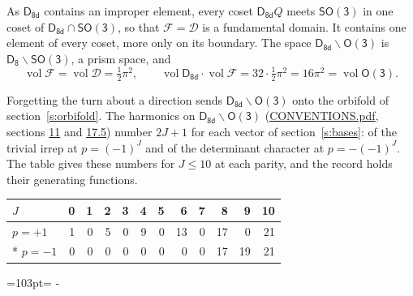\documentclass[10pt,a4paper]{article}
\newcommand{\needspace}[1]{\par\penalty-100\begingroup\dimen0=#1\relax\dimen2=\pagegoal
  \advance\dimen2-\pagetotal\ifdim\dimen0>\dimen2\relax\ifdim\dimen2>0pt\vfil\break\fi\fi
  \endgroup}
\numberwithin{equation}{section}
\newcommand{\grp}[1]{\mathsf{#1}}
\newcommand{\vol}{\operatorname{vol}}
\newcommand{\fcell}{\mathcal{D}}
\newcommand{\fdomain}{\mathcal{F}}
\begin{document}
\leavevmode\label{n:set.fundamental}As $\grp{D_{8d}}$ contains an improper element, every coset $\grp{D_{8d}}Q$ meets \href{SO3.pdf}{$\grp{SO(3)}$} in one coset of $\grp{D_{8d}} \cap \grp{SO(3)}$, so that $\fdomain = \fcell$ is a fundamental domain. It contains one element of every coset, more only on its boundary.
The space $\grp{D_{8d}}\backslash\grp{O(3)}$ is $\grp{D_{8}}\backslash\grp{SO(3)}$, a prism space, and
\begin{equation}\label{e:volume}\vol\fdomain = \vol\fcell = \tfrac{1}{2}\pi^2,\qquad \vol\grp{D_{8d}}\cdot\vol\fdomain = 32\cdot \tfrac{1}{2}\pi^2 = 16\pi^2 = \vol\grp{O(3)}.\end{equation}

Forgetting the turn about a direction sends $\grp{D_{8d}}\backslash\grp{O(3)}$ onto the orbifold of section~\ref{s:orbifold}.
The harmonics on $\grp{D_{8d}}\backslash\grp{O(3)}$ (\href{../../CONVENTIONS.pdf}{CONVENTIONS.pdf}, sections \href{../../CONVENTIONS.pdf\#conv.11}{11} and \href{../../CONVENTIONS.pdf\#conv.17.5}{17.5}) number $2J + 1$ for each vector of section~\ref{s:bases}: of the trivial irrep at $p = (-1)^J$ and of the determinant character at $p = -(-1)^J$. The table gives these numbers for $J \le 10$ at each parity, and the record holds their generating functions.
{\small\setlength{\tabcolsep}{4pt}\begin{longtable}{@{}lrrrrrrrrrrr@{}}\toprule
$J$ & 0 & 1 & 2 & 3 & 4 & 5 & 6 & 7 & 8 & 9 & 10\\\midrule\endhead
\bottomrule\endfoot\endlastfoot
$p = +1$ & 1 & 0 & 5 & 0 & 9 & 0 & 13 & 0 & 17 & 0 & 21\\*
$p = -1$ & 0 & 0 & 0 & 0 & 0 & 0 & 0 & 0 & 17 & 19 & 21\\
\bottomrule\end{longtable}}
\needspace{103pt}
\end{document}
